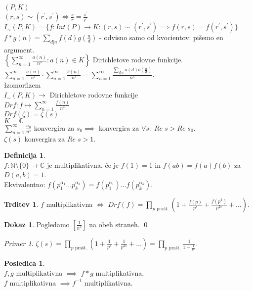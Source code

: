 \documentclass[a4paper, 12pt]{book}
\theoremstyle{definition}
\newtheorem{defn}[counter]{Definicija}
\newtheorem{conseq}[counter]{Posledica}
\newtheorem{claim}[counter]{Trditev}
\newtheorem{pro}[counter]{Dokaz}
\theoremstyle{remark}
\newtheorem*{ex}{Primer}
\newcommand{\N}{\mathbb{N}}
\newcommand{\C}{\mathbb{C}}
\begin{document}
$(P, K)$ \\
$(r, s) \sim (r^{'}, s^{'}) \iff \frac{s}{r} = \frac{s^{'}}{r^{'}}$ \\
$I_{\sim} (P, K) = \{f: Int(P) \to K: (r, s) \sim (r^{'}, s^{'}) \implies f(r, s) = f(r^{'}, s^{'})\}$ \\
$f * g(n) = \sum_{d | n} f(d) g\left(\frac{n}{d}\right)$ - odvisno samo od kvocientov: pišemo en argument. \\
$\left\{ \sum_{n=1}^{\infty} \frac{a(n)}{n^s}: a(n) \in K\right\}$ Dirichletove rodovne funkcije. \\
$\sum_{n=1}^{\infty} \frac{a(n)}{n^s} \cdot \sum_{n=1}^{\infty} \frac{b(n)}{n^s} =
\sum_{n=1}^{\infty} \frac{\sum_{d | n} a(d) b\left(\frac{n}{d}\right)}{n^s}$. \\
Izomorfizem \\
$I_{\sim} (P, K) \to$ Dirichletove rodovne funkcije \\
$Drf: f \mapsto \sum_{n=1}^{\infty} \frac{f(n)}{n^s}$ \\
$Drf(\zeta) = \zeta(s)$ \\
$K = \C$ \\
$\sum_{n=1}^{\infty} \frac{a_n}{n^s}$ konvergira za $s_0 \implies$ konvergira za $\forall s: \; Re \; s > Re \; s_0$. \\
$\zeta(s)$ konvergira za $Re \; s > 1$.
\begin{defn} \text{} \\
  $f: \N \setminus \{0\} \to \C$ je multiplikativna, če je $f(1) = 1$ in $f(ab) = f(a) f(b)$ za $D(a, b) = 1$. \\
  Ekvivalentno: $f\left(p_1^{\alpha_1} \dots p_k^{\alpha_k}\right) =
  f\left(p_1^{\alpha_1}\right) \dots f\left(p_k^{\alpha_k}\right)$.
\end{defn}
\begin{claim}
  $f$ multiplikativna $\iff$ $Drf(f) =
  \prod_{p \text{ prašt.}} \left(1 + \frac{f(p)}{p^s} + \frac{f(p^2)}{p^{2s}} + \dots\right)$.
\end{claim}
\begin{pro}
  Pogledamo $\left[\frac{1}{n^s}\right]$ na obeh straneh.
  \qed
\end{pro}
\begin{ex}
  $\zeta(s) = \prod_{p \text{ prašt.}} \left(1 + \frac{1}{p^s} + \frac{1}{p^{2s}} + \dots \right)
  = \prod_{p \text{ prašt.}} \frac{1}{1 - \frac{1}{p^s}}$.
\end{ex}
\begin{conseq} \text{} \\
  $f, g$ multiplikativna $\implies$ $f * g$ multiplikativna, \\
  $f$ multiplikativna $\implies f^{-1}$ multiplikativna. 
\end{conseq}
\end{document}
